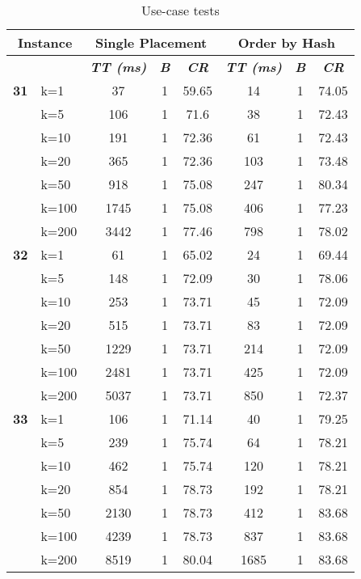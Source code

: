     \begin{table}[htbp]
    \caption{Use-case tests}
    \begin{tabular}{|l|l|c|c|c|c|c|c|}
    
    \multicolumn{ 2}{|c|}{\textbf{Instance}} & \multicolumn{ 3}{c|}{\textbf{Single Placement}} & \multicolumn{ 3}{c|}{\textbf{Order by Hash}} \\ \hline
    \multicolumn{ 2}{|l|}{} & \textbf{\textit{TT (ms)}} & \textbf{\textit{B}} & \textbf{\textit{CR}} & \textbf{\textit{TT (ms)}} & \textbf{\textit{B}} & \textbf{\textit{CR}} \\ \hline
    \multicolumn{1}{|r|}{\textbf{31}} & k=1 & 37 & 1 & 59.65 & 14 & 1 & 74.05 \\ 
     & k=5 & 106 & 1 & 71.6 & 38 & 1 & 72.43 \\ 
     & k=10 & 191 & 1 & 72.36 & 61 & 1 & 72.43 \\ 
     & k=20 & 365 & 1 & 72.36 & 103 & 1 & 73.48 \\ 
     & k=50 & 918 & 1 & 75.08 & 247 & 1 & 80.34 \\ 
     & k=100 & 1745 & 1 & 75.08 & 406 & 1 & 77.23 \\ 
     & k=200 & 3442 & 1 & 77.46 & 798 & 1 & 78.02 \\ \hline
    \multicolumn{1}{|r|}{\textbf{32}} & k=1 & 61 & 1 & 65.02 & 24 & 1 & 69.44 \\ 
     & k=5 & 148 & 1 & 72.09 & 30 & 1 & 78.06 \\ 
     & k=10 & 253 & 1 & 73.71 & 45 & 1 & 72.09 \\ 
     & k=20 & 515 & 1 & 73.71 & 83 & 1 & 72.09 \\ 
     & k=50 & 1229 & 1 & 73.71 & 214 & 1 & 72.09 \\ 
     & k=100 & 2481 & 1 & 73.71 & 425 & 1 & 72.09 \\ 
     & k=200 & 5037 & 1 & 73.71 & 850 & 1 & 72.37 \\ \hline
    \multicolumn{1}{|r|}{\textbf{33}} & k=1 & 106 & 1 & 71.14 & 40 & 1 & 79.25 \\ 
     & k=5 & 239 & 1 & 75.74 & 64 & 1 & 78.21 \\ 
     & k=10 & 462 & 1 & 75.74 & 120 & 1 & 78.21 \\ 
     & k=20 & 854 & 1 & 78.73 & 192 & 1 & 78.21 \\ 
     & k=50 & 2130 & 1 & 78.73 & 412 & 1 & 83.68 \\ 
     & k=100 & 4239 & 1 & 78.73 & 837 & 1 & 83.68 \\ 
     & k=200 & 8519 & 1 & 80.04 & 1685 & 1 & 83.68 \\ \hline

\end{tabular}
\end{table}
